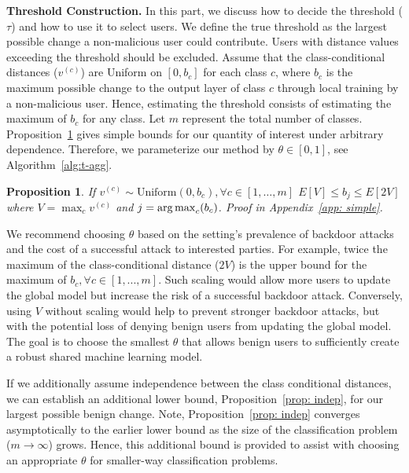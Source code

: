 \documentclass{article} %
\newtheorem{prop}{Proposition}
\begin{document}
\vspace{-10pt}
\textbf{Threshold Construction.} In this part, we discuss how to decide the threshold ($\tau$) and how to use it to select users. We define the true threshold as the largest possible change a non-malicious user could contribute. Users with distance values exceeding the threshold should be excluded. Assume that the class-conditional distances ($v^{(c)}$) are Uniform on $[0, b_c]$ for each class $c$, where $b_c$ is the maximum possible change to the output layer of class $c$ through local training by a non-malicious user. Hence, estimating the threshold consists of estimating the maximum of $b_c$ for any class.  Let $m$ represent the total number of classes. Proposition~\ref{prop: simple} gives simple bounds for our quantity of interest under arbitrary dependence. Therefore, we parameterize our method by $\theta \in [0, 1]$, see Algorithm~\ref{alg:t-agg}.

\vspace{-5pt}
\begin{prop}
\label{prop: simple}
    If $v^{(c)} \sim \text{Uniform}(0, b_c), \forall c \in [1, \ldots, m]$  $E \left[ V \right] \leq b_j \leq E \left[ 2 V \right]$ where $V = \max_c v^{(c)}$ and $j = \operatorname*{arg\,max}_c(b_c)$. Proof in Appendix~\ref{app: simple}.
\end{prop}
\vspace{-5pt}

We recommend choosing $\theta$ based on the setting's prevalence of backdoor attacks and the cost of a successful attack to interested parties. For example, twice the maximum of the class-conditional distance ($2V$) is the upper bound for the maximum of $b_c, \forall c\in [1,...,m]$. Such scaling would allow more users to update the global model but increase the risk of a successful backdoor attack. Conversely, using $V$ without scaling would help to prevent stronger backdoor attacks, but with the potential loss of denying benign users from updating the global model. The goal is to choose the smallest $\theta$ that allows benign users to sufficiently create a robust shared machine learning model.

If we additionally assume independence between the class conditional distances, we can establish an additional lower bound, Proposition~\ref{prop: indep}, for our largest possible benign change. Note, Proposition~\ref{prop: indep} converges asymptotically to the earlier lower bound as the size of the classification problem ($m \rightarrow \infty$) grows. Hence, this additional bound is provided to assist with choosing an appropriate $\theta$ for smaller-way classification problems. 
\end{document}
